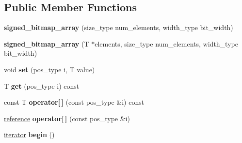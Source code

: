 \subsection*{Public Member Functions}
\begin{DoxyCompactItemize}
\item 
\mbox{\label{classdialog_1_1signed__bitmap__array_af46bd6645f69d573464069004a7fdd10}} 
{\bfseries signed\+\_\+bitmap\+\_\+array} (size\+\_\+type num\+\_\+elements, width\+\_\+type bit\+\_\+width)
\item 
\mbox{\label{classdialog_1_1signed__bitmap__array_ab25344992051cc9af41d075d1d6c40bd}} 
{\bfseries signed\+\_\+bitmap\+\_\+array} (T $\ast$elements, size\+\_\+type num\+\_\+elements, width\+\_\+type bit\+\_\+width)
\item 
\mbox{\label{classdialog_1_1signed__bitmap__array_ad0ca1786913ee0666c1702d6f54a3118}} 
void {\bfseries set} (pos\+\_\+type i, T value)
\item 
\mbox{\label{classdialog_1_1signed__bitmap__array_a1a2b78610fc1284e53659c81af1d51e9}} 
T {\bfseries get} (pos\+\_\+type i) const
\item 
\mbox{\label{classdialog_1_1signed__bitmap__array_a8f2f59f09f9279f5ee7a546798badd6f}} 
const T {\bfseries operator\mbox{[}$\,$\mbox{]}} (const pos\+\_\+type \&i) const
\item 
\mbox{\label{classdialog_1_1signed__bitmap__array_a68bfbf4f2a21a7bdd47d870f7c2d6323}} 
\hyperlink{classdialog_1_1value__reference}{reference} {\bfseries operator\mbox{[}$\,$\mbox{]}} (const pos\+\_\+type \&i)
\item 
\mbox{\label{classdialog_1_1signed__bitmap__array_ae7d9dd5e73774adbe1625d829ce56fcd}} 
\hyperlink{classdialog_1_1bitmap__array__iterator}{iterator} {\bfseries begin} ()
\item 
\mbox{\label{classdialog_1_1signed__bitmap__array_ae5ad81b3292f6f3916e8a9409b8f75bd}} 

\end{DoxyCompactItemize}
